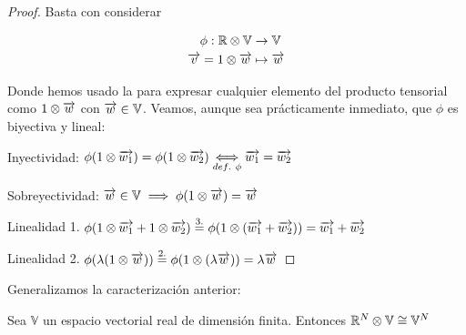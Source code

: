 \begin{proof}
	Basta con considerar

	\begin{equation}
		\begin{split}
			\phi: \mathbb{R} \otimes \mathbb{V} &\to \mathbb{V} \\
			\overrightarrow{v} = 1 \otimes \overrightarrow{w} &\mapsto \overrightarrow{w}
		\end{split}
	\end{equation}

	Donde hemos usado la  para expresar cualquier elemento del producto tensorial como $1 \otimes \overrightarrow{w}$ con $\overrightarrow{w} \in \mathbb{V}$. Veamos, aunque sea prácticamente inmediato, que $\phi$ es biyectiva y lineal:

	Inyectividad: $\phi(1 \otimes \overrightarrow{w_1}) = \phi(1 \otimes \overrightarrow{w_2}) \underset{def.\ \phi}{\Longleftrightarrow} \overrightarrow{w_1} = \overrightarrow{w_2}$

	Sobreyectividad: $\overrightarrow{w} \in \mathbb{V} \implies \phi(1 \otimes \overrightarrow{w}) = \overrightarrow{w}$

	Linealidad 1. $\phi(1 \otimes \overrightarrow{w_1} + 1 \otimes \overrightarrow{w_2}) \stackrel{\text{3.}}{=} \phi(1 \otimes (\overrightarrow{w_1} + \overrightarrow{w_2})) = \overrightarrow{w_1} + \overrightarrow{w_2}$

	Linealidad 2. $\phi(\lambda (1 \otimes \overrightarrow{w})) \stackrel{\text{2.}}{=} \phi(1 \otimes (\lambda \overrightarrow{w})) = \lambda \overrightarrow{w}$

\end{proof}

Generalizamos la caracterización anterior:

\begin{proposicion} Sea $\mathbb{V}$ un espacio vectorial real de dimensión finita. Entonces $\mathbb{R}^N \otimes \mathbb{V}  \cong \mathbb{V}^N$
\end{proposicion}


